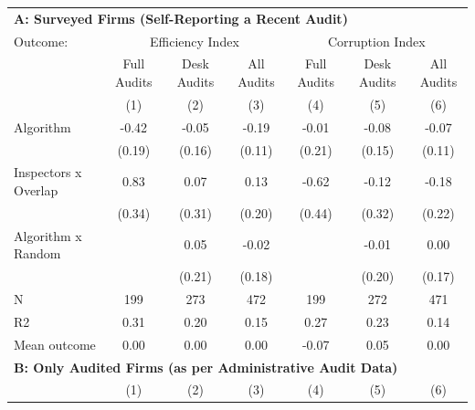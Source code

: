 \begin{tabular}{lccc|ccc} \toprule
\multicolumn{7}{l}{\textbf{A: Surveyed Firms (Self-Reporting a Recent Audit)}} \\ \multicolumn{1}{l}{Outcome:} & \multicolumn{3}{c}{Efficiency Index} & \multicolumn{3}{c}{Corruption Index} \\ \multicolumn{1}{l}{} & Full Audits & Desk Audits & All Audits & Full Audits & Desk Audits & All Audits \\ \multicolumn{1}{l}{} & (1) & (2) & (3) & (4) & (5) & (6) \\ \midrule
Algorithm   &       -0.42\sym{**} &       -0.05         &       -0.19\sym{*}  &       -0.01         &       -0.08         &       -0.07         \\
            &      (0.19)         &      (0.16)         &      (0.11)         &      (0.21)         &      (0.15)         &      (0.11)         \\
\addlinespace
Inspectors x Overlap&        0.83\sym{**} &        0.07         &        0.13         &       -0.62         &       -0.12         &       -0.18         \\
            &      (0.34)         &      (0.31)         &      (0.20)         &      (0.44)         &      (0.32)         &      (0.22)         \\
\addlinespace
Algorithm x Random&                     &        0.05         &       -0.02         &                     &       -0.01         &        0.00         \\
            &                     &      (0.21)         &      (0.18)         &                     &      (0.20)         &      (0.17)         \\
\midrule
N           &         199         &         273         &         472         &         199         &         272         &         471         \\
R2          &        0.31         &        0.20         &        0.15         &        0.27         &        0.23         &        0.14         \\
Mean outcome&        0.00         &        0.00         &        0.00         &       -0.07         &        0.05         &        0.00         \\

\midrule \multicolumn{7}{l}{\textbf{B: Only Audited Firms (as per Administrative Audit Data)}} \\ \multicolumn{1}{l}{} & (1) & (2) & (3) & (4) & (5) & (6) \\ \midrule


\end{tabular}
